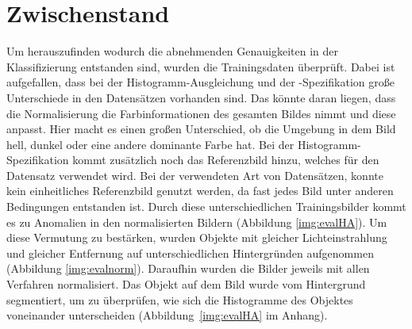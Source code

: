\section{Zwischenstand}
Um herauszufinden wodurch die abnehmenden Genauigkeiten in der Klassifizierung entstanden sind, wurden die Trainingsdaten überprüft. Dabei ist aufgefallen, dass bei der Histogramm-Ausgleichung und der -Spezifikation große Unterschiede in den Datensätzen vorhanden sind. Das könnte daran liegen, dass die Normalisierung die Farbinformationen des gesamten Bildes nimmt und diese anpasst. Hier macht es einen großen Unterschied, ob die Umgebung in dem Bild hell, dunkel oder eine andere dominante Farbe hat. Bei der Histogramm-Spezifikation kommt zusätzlich noch das Referenzbild hinzu, welches für den Datensatz verwendet wird. Bei der verwendeten Art von Datensätzen, konnte kein einheitliches Referenzbild genutzt werden, da fast jedes Bild unter anderen Bedingungen entstanden ist. Durch diese unterschiedlichen Trainingsbilder kommt es zu Anomalien in den normalisierten Bildern (Abbildung \ref{img:evalHA}). Um diese Vermutung zu bestärken, wurden Objekte mit gleicher Lichteinstrahlung und gleicher Entfernung auf unterschiedlichen Hintergründen aufgenommen (Abbildung \ref{img:evalnorm}). Daraufhin wurden die Bilder jeweils mit allen Verfahren normalisiert. Das Objekt auf dem Bild wurde vom Hintergrund segmentiert, um zu überprüfen, wie sich die Histogramme des Objektes voneinander unterscheiden (Abbildung~\ref{img:evalHA} im Anhang).\\
